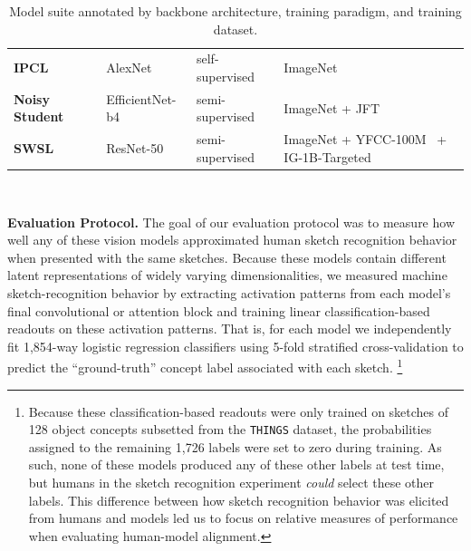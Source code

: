 \documentclass{article}
\begin{document}
\begin{table}[hbp!]
{\begin{tabular}{l|l|l|l}
\textbf{\textcolor{IPCL}{IPCL}}~\cite{konkle2021beyond} & AlexNet & self-supervised & ImageNet\\
\textbf{\textcolor{Noisy Student}{Noisy Student}}~\cite{xie2020self} & EfficientNet-b4 & semi-supervised & ImageNet + JFT~\cite{sun2017revisiting}\\
\textbf{\textcolor{SWSL}{SWSL}}~\cite{yalniz2019billion} &  ResNet-50  & semi-supervised & ImageNet + YFCC-100M~\cite{thomee2016yfcc100m} + IG-1B-Targeted~\cite{yalniz2019billion}\\
\bottomrule 
\end{tabular}%
\\
}
\vspace{1em}
\caption{Model suite annotated by backbone architecture, training paradigm, and training dataset.}
\vspace{-1em}
\label{tab:models}
\end{table}


\textbf{Evaluation Protocol.}
The goal of our evaluation protocol was to measure how well any of these vision models approximated human sketch recognition behavior when presented with the same sketches. 
Because these models contain different latent representations of widely varying dimensionalities, we measured machine sketch-recognition behavior by extracting activation patterns from each model's final convolutional or attention block and training linear classification-based readouts on these activation patterns. 
That is, for each model we independently fit 1,854-way logistic regression classifiers using 5-fold stratified cross-validation to predict the ``ground-truth'' concept label associated with each sketch.
\footnote{Because these classification-based readouts were only trained on sketches of 128 object concepts subsetted from the \texttt{THINGS} dataset, the probabilities assigned to the remaining 1,726 labels were set to zero during training. As such, none of these models produced any of these other labels at test time, but humans in the sketch recognition experiment \textit{could} select these other labels. This difference between how sketch recognition behavior was elicited from humans and models led us to focus on relative measures of performance when evaluating human-model alignment.} 

\end{document}
